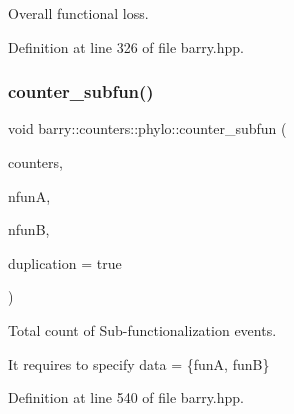Overall functional loss. 



Definition at line 326 of file barry.\+hpp.

\mbox{\label{namespacebarry_1_1counters_1_1phylo_ad36131d4405a758fa200fd29932f49ea}} 
\subsubsection{\texorpdfstring{counter\+\_\+subfun()}{counter\_subfun()}}
{\footnotesize\ttfamily void barry\+::counters\+::phylo\+::counter\+\_\+subfun (\begin{DoxyParamCaption}\item[{\hyperlink{namespacebarry_1_1counters_1_1phylo_a4e401ffe66d04091343dcffaf915f8c3}{Phylo\+Counters} $\ast$}]{counters,  }\item[{\hyperlink{namespacebarry_a11dfc53ddb4672278319aa04f1e09a6c}{uint}}]{nfunA,  }\item[{\hyperlink{namespacebarry_a11dfc53ddb4672278319aa04f1e09a6c}{uint}}]{nfunB,  }\item[{bool}]{duplication = {\ttfamily true} }\end{DoxyParamCaption})\hspace{0.3cm}{\ttfamily [inline]}}



Total count of Sub-\/functionalization events. 

It requires to specify data = \{funA, funB\} 

Definition at line 540 of file barry.\+hpp.

